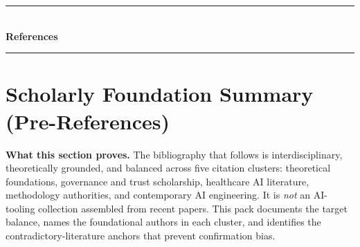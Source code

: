 \documentclass[12pt,a4paper,oneside]{report}
\begin{document}
\clearpage
\thispagestyle{empty}\mbox{}\clearpage          %
\thispagestyle{empty}%
\vspace*{\fill}%
\begin{center}%
  {\color{ggugold}\rule{0.6\textwidth}{1.5pt}}\\[1.5cm]%
  {\Huge\bfseries\color{ggunavy}References}\\[1.5cm]%
  {\color{ggugold}\rule{0.6\textwidth}{0.8pt}}%
\end{center}%
\vspace*{\fill}%
\clearpage


\chapter*{Scholarly Foundation Summary (Pre-References)}
\label{sec:scholarly_foundation_pack}

\noindent\textbf{What this section proves.} The bibliography that follows is interdisciplinary, theoretically grounded, and balanced across five citation clusters: theoretical foundations, governance and trust scholarship, healthcare AI literature, methodology authorities, and contemporary AI engineering. It is \emph{not} an AI-tooling collection assembled from recent papers. This pack documents the target balance, names the foundational authors in each cluster, and identifies the contradictory-literature anchors that prevent confirmation bias.
\end{document}
